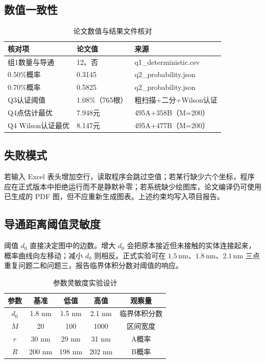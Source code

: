 \documentclass[12pt,a4paper,fontset=windows]{ctexart}
\newcommand{\nm}{\,\mathrm{nm}}
\begin{document}
\subsection{数值一致性}
\begin{table}[H]\centering\caption{论文数值与结果文件核对}\begin{tabular}{p{5cm}p{4cm}p{4cm}}\toprule 核对项&论文值&来源\\\midrule 组1数量与导通&12、否&q1\_deterministic.csv\\ 0.50\%概率&0.3145&q2\_probability.json\\ 0.70\%概率&0.5825&q2\_probability.json\\ Q3认证阈值&1.08\%（765根）&粗扫描+二分+Wilson认证\\ Q4点估计最优&7.948元&495A+358B（M=200）\\ Q4 Wilson认证最优&8.147元&495A+477B（M=200）\\\bottomrule\end{tabular}\end{table}

\subsection{失败模式}
若输入 Excel 表头增加空行，读取程序会跳过空值；若某行缺少六个坐标，程序应在正式版本中拒绝运行而不是静默补零；若系统缺少绘图库，论文编译仍可使用已生成的 PDF 图，但不应重新生成图表。上述约束均写入项目报告。

\subsection{导通距离阈值灵敏度}
阈值 $d_0$ 直接决定图中的边数。增大 $d_0$ 会把原本接近但未接触的实体连接起来，概率曲线向左移动；减小 $d_0$ 则相反。正式实验可在 $1.5\nm$、$1.8\nm$、$2.1\nm$ 三点重复问题二和问题三，报告临界体积分数对阈值的响应。
\begin{table}[H]\centering\caption{参数灵敏度实验设计}\begin{tabular}{ccccc}\toprule 参数&基准&低值&高值&观察量\\\midrule $d_0$&1.8 nm&1.5 nm&2.1 nm&临界体积分数\\ $M$&20&100&1000&区间宽度\\ $r$&30 nm&29 nm&31 nm&A概率\\ $R$&200 nm&198 nm&202 nm&B概率\\\bottomrule\end{tabular}\end{table}
\end{document}
